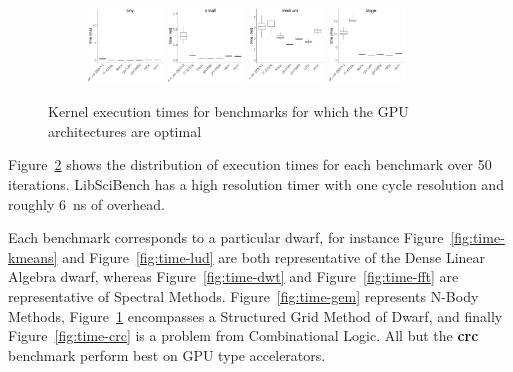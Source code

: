 \documentclass[../document.tex]{subfiles}
\begin{document}
\begin{figure}
	\begin{subfigure}{0.09\textwidth} \label{fig:time-srad} \vspace{5mm}\end{subfigure}
	\begin{subfigure}{0.9\textwidth}
		\includegraphics[width=0.22\textwidth]{figures/time-results/generate_srad_tiny_boxplot-1}
		\includegraphics[width=0.22\textwidth]{figures/time-results/generate_srad_small_boxplot-1}
		\includegraphics[width=0.22\textwidth]{figures/time-results/generate_srad_medium_boxplot-1}
		\includegraphics[width=0.22\textwidth]{figures/time-results/generate_srad_large_boxplot-1}
	\end{subfigure}
    \caption{Kernel execution times for benchmarks for which the GPU architectures are optimal}\label{fig:time}
\end{figure}


Figure~\ref{fig:time} shows the distribution of execution times for each benchmark over 50 iterations.
LibSciBench has a high resolution timer with one cycle resolution and roughly \SI{6}{\nano\second} of overhead.

Each benchmark corresponds to a particular dwarf, for instance Figure~\ref{fig:time-kmeans} and Figure~\ref{fig:time-lud} are both representative of the Dense Linear Algebra dwarf, whereas Figure~\ref{fig:time-dwt} and Figure~\ref{fig:time-fft} are representative of Spectral Methods.
Figure~\ref{fig:time-gem} represents N-Body Methods, Figure~\ref{fig:time-srad} encompasses a Structured Grid Method of Dwarf, and finally Figure~\ref{fig:time-crc} is a problem from Combinational Logic.
All but the {\bf crc} benchmark perform best on GPU type accelerators.
\end{document}
